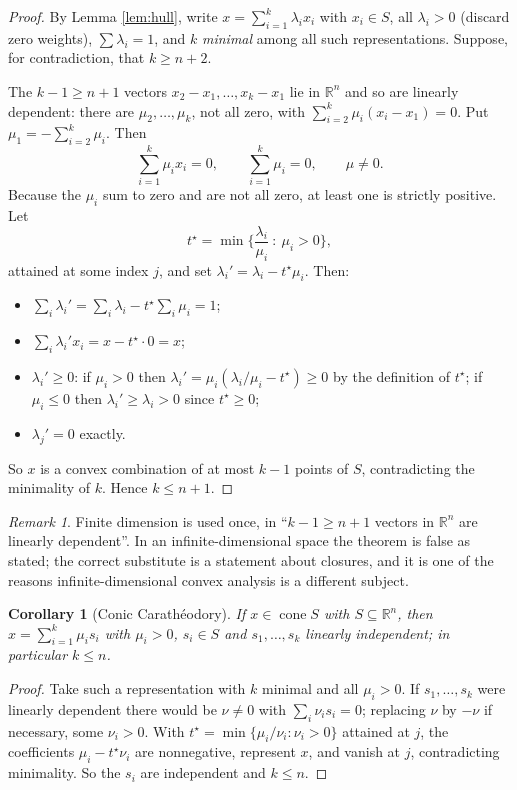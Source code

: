 \documentclass[11pt,a4paper]{article}
\theoremstyle{definition}
\theoremstyle{plain}
\newtheorem{corollary}[theorem]{Corollary}
\theoremstyle{remark}
\newtheorem*{remark}{Remark}
\newcommand{\R}{\mathbb{R}}
\DeclareMathOperator{\cone}{cone}
\begin{document}
\begin{proof}
By Lemma \ref{lem:hull}, write $x=\sum_{i=1}^k\lambda_ix_i$ with $x_i\in S$, all
$\lambda_i>0$ (discard zero weights), $\sum\lambda_i=1$, and $k$ \emph{minimal} among all such
representations. Suppose, for contradiction, that $k\ge n+2$.

The $k-1\ge n+1$ vectors $x_2-x_1,\dots,x_k-x_1$ lie in $\R^n$ and so are linearly dependent:
there are $\mu_2,\dots,\mu_k$, not all zero, with $\sum_{i=2}^k\mu_i(x_i-x_1)=0$. Put
$\mu_1=-\sum_{i=2}^k\mu_i$. Then
\[
\sum_{i=1}^k\mu_ix_i=0,\qquad \sum_{i=1}^k\mu_i=0,\qquad \mu\ne0 .
\]
Because the $\mu_i$ sum to zero and are not all zero, at least one is strictly positive. Let
\[
t^\star=\min\Big\{\frac{\lambda_i}{\mu_i}\ :\ \mu_i>0\Big\},
\]
attained at some index $j$, and set $\lambda_i'=\lambda_i-t^\star\mu_i$. Then:
\begin{itemize}
\item $\sum_i\lambda_i'=\sum_i\lambda_i-t^\star\sum_i\mu_i=1$;
\item $\sum_i\lambda_i'x_i=x-t^\star\cdot0=x$;
\item $\lambda_i'\ge0$: if $\mu_i>0$ then $\lambda_i'=\mu_i(\lambda_i/\mu_i-t^\star)\ge0$ by the
definition of $t^\star$; if $\mu_i\le0$ then $\lambda_i'\ge\lambda_i>0$ since $t^\star\ge0$;
\item $\lambda_j'=0$ exactly.
\end{itemize}
So $x$ is a convex combination of at most $k-1$ points of $S$, contradicting the minimality of
$k$. Hence $k\le n+1$.
\end{proof}

\begin{remark}
Finite dimension is used once, in ``$k-1\ge n+1$ vectors in $\R^n$ are linearly dependent''.
In an infinite-dimensional space the theorem is false as stated; the correct substitute is a
statement about closures, and it is one of the reasons infinite-dimensional convex analysis is
a different subject.
\end{remark}

\begin{corollary}[Conic Carath\'eodory]
\label{cor:conecara}
If $x\in\cone S$ with $S\subseteq\R^n$, then $x=\sum_{i=1}^k\mu_is_i$ with $\mu_i>0$, $s_i\in S$
and $s_1,\dots,s_k$ \emph{linearly independent}; in particular $k\le n$.
\end{corollary}

\begin{proof}
Take such a representation with $k$ minimal and all $\mu_i>0$. If $s_1,\dots,s_k$ were linearly
dependent there would be $\nu\ne0$ with $\sum_i\nu_is_i=0$; replacing $\nu$ by $-\nu$ if
necessary, some $\nu_i>0$. With $t^\star=\min\{\mu_i/\nu_i:\nu_i>0\}$ attained at $j$, the
coefficients $\mu_i-t^\star\nu_i$ are nonnegative, represent $x$, and vanish at $j$,
contradicting minimality. So the $s_i$ are independent and $k\le n$.
\end{proof}
\end{document}

